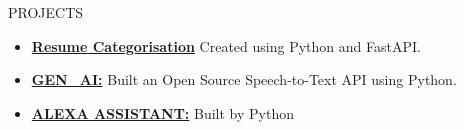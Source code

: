 \documentclass{resume}
\begin{document}
\begin{rSection}{PROJECTS}
    \begin{itemize}
        \item \textbf{\href{https://github.com/trishaamandal/tracking_number}{Resume Categorisation}} {Created using Python and FastAPI.}
        \vspace{-0.6em}
        \item \textbf{\href{https://github.com/trishaamandal/Gen-AI}{GEN\_AI:}} {Built an Open Source Speech-to-Text API using Python.}
        \vspace{-0.6em}
        \item \textbf{\href{https://github.com/trishaamandal/VoiceAssistent}{ALEXA ASSISTANT:}} {Built by Python}
        \vspace{-0.6em}
    \end{itemize}
\end{rSection}
\vspace{-0.4em}
\end{document}
